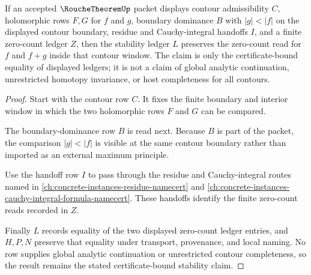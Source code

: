 \begin{theorem}
\label{thm:rouche-namecert-contour-zero-stability}
If an accepted $\RoucheTheoremUp$ packet displays contour admissibility $C$, holomorphic rows $F,G$ for $f$ and $g$, boundary dominance $B$ with $|g|<|f|$ on the displayed contour boundary, residue and Cauchy-integral handoffs $I$, and a finite zero-count ledger $Z$, then the stability ledger $L$ preserves the zero-count read for $f$ and $f+g$ inside that contour window. The claim is only the certificate-bound equality of displayed ledgers; it is not a claim of global analytic continuation, unrestricted homotopy invariance, or host completeness for all contours.
\end{theorem}
\begin{proof}
Start with the contour row $C$. It fixes the finite boundary and interior window in which the two holomorphic rows $F$ and $G$ can be compared.

The boundary-dominance row $B$ is read next. Because $B$ is part of the packet, the comparison $|g|<|f|$ is visible at the same contour boundary rather than imported as an external maximum principle.

Use the handoff row $I$ to pass through the residue and Cauchy-integral routes named in \autoref{ch:concrete-instances-residue-namecert} and \autoref{ch:concrete-instances-cauchy-integral-formula-namecert}. These handoffs identify the finite zero-count reads recorded in $Z$.

Finally $L$ records equality of the two displayed zero-count ledger entries, and $H,P,N$ preserve that equality under transport, provenance, and local naming. No row supplies global analytic continuation or unrestricted contour completeness, so the result remains the stated certificate-bound stability claim.
\end{proof}

